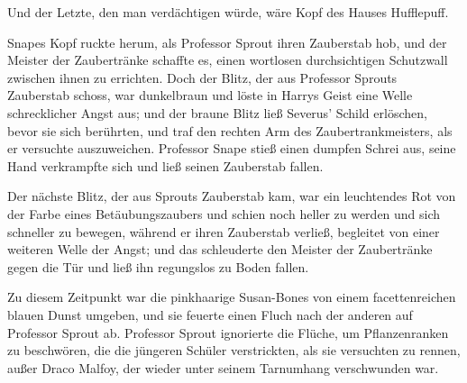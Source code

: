 Und der Letzte, den man verdächtigen würde, wäre Kopf des Hauses Hufflepuff.

Snapes Kopf ruckte herum, als Professor Sprout ihren Zauberstab hob, und der Meister der Zaubertränke schaffte es, einen wortlosen durchsichtigen Schutzwall zwischen ihnen zu errichten. Doch der Blitz, der aus Professor Sprouts Zauberstab schoss, war dunkelbraun und löste in Harrys Geist eine Welle schrecklicher Angst aus; und der braune Blitz ließ Severus’ Schild erlöschen, bevor sie sich berührten, und traf den rechten Arm des Zaubertrankmeisters, als er versuchte auszuweichen. Professor Snape stieß einen dumpfen Schrei aus, seine Hand verkrampfte sich und ließ seinen Zauberstab fallen.

Der nächste Blitz, der aus Sprouts Zauberstab kam, war ein leuchtendes Rot von der Farbe eines Betäubungszaubers und schien noch heller zu werden und sich schneller zu bewegen, während er ihren Zauberstab verließ, begleitet von einer weiteren Welle der Angst; und das schleuderte den Meister der Zaubertränke gegen die Tür und ließ ihn regungslos zu Boden fallen.

Zu diesem Zeitpunkt war die pinkhaarige Susan-Bones von einem facettenreichen blauen Dunst umgeben, und sie feuerte einen Fluch nach der anderen auf Professor Sprout ab. Professor Sprout ignorierte die Flüche, um Pflanzenranken zu beschwören, die die jüngeren Schüler verstrickten, als sie versuchten zu rennen, außer Draco Malfoy, der wieder unter seinem Tarnumhang verschwunden war.

